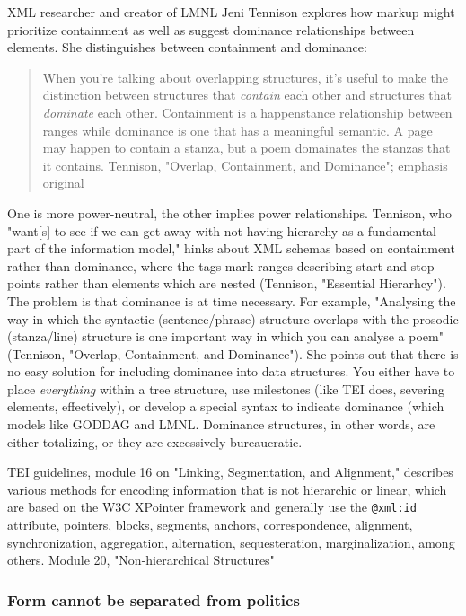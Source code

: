 \documentclass[11pt]{article}
\begin{document}
XML researcher and creator of LMNL Jeni Tennison explores how markup
might prioritize containment as well as suggest dominance
relationships between elements. She distinguishes between containment
and dominance:
\begin{quote}
When you’re talking about overlapping structures, it’s useful to make
the distinction between structures that \emph{contain} each other and
structures that \emph{dominate} each other. Containment is a happenstance
relationship between ranges while dominance is one that has a
meaningful semantic. A page may happen to contain a stanza, but a poem
domainates the stanzas that it contains. Tennison, "Overlap,
Containment, and Dominance"; emphasis original
\end{quote}
One is more power-neutral, the other implies power
relationships. Tennison, who "want[s] to see if we can get away with
not having hierarchy as a fundamental part of the information model,"
hinks about XML schemas based on containment rather than dominance,
where the tags mark ranges describing start and stop points rather
than elements which are nested (Tennison, "Essential Hierarhcy"). The
problem is that dominance is at time necessary. For example,
"Analysing the way in which the syntactic (sentence/phrase) structure
overlaps with the prosodic (stanza/line) structure is one important
way in which you can analyse a poem" (Tennison, "Overlap, Containment,
and Dominance"). She points out that there is no easy solution for
including dominance into data structures. You either have to place
\emph{everything} within a tree structure, use milestones (like TEI does,
severing elements, effectively), or develop a special syntax to
indicate dominance (which models like GODDAG and LMNL. Dominance
structures, in other words, are either totalizing, or they are
excessively bureaucratic.

TEI guidelines, module 16 on "Linking, Segmentation, and Alignment,"
describes various methods for encoding information that is not
hierarchic or linear, which are based on the W3C XPointer framework
and generally use the \texttt{@xml:id} attribute, pointers, blocks, segments,
anchors, correspondence, alignment, synchronization, aggregation,
alternation, sequesteration, marginalization, among others. Module 20,
"Non-hierarchical Structures" 

\subsubsection{Form cannot be separated from politics}
\label{sec:orgd075ac4}
\end{document}
